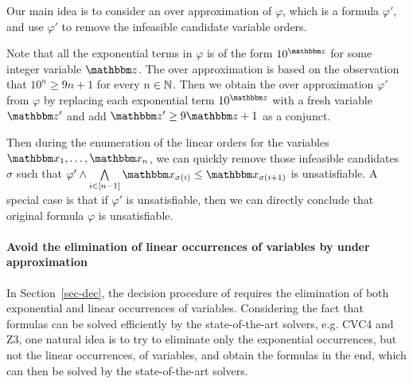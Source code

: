 Our main idea is to consider an over approximation of $\varphi$, which is a {\pa} formula $\varphi'$, and use $\varphi'$ to remove the infeasible candidate variable orders.

Note that all the exponential terms in $\varphi$ is of the form $10^{\ivarz}$ for some integer variable $\ivarz$. 
%
The over approximation is based on the observation that $10^n \ge 9 n + 1$ for every $n \in \mathbb{N}$. Then we obtain the over approximation $\varphi'$ from $\varphi$ by replacing each exponential term $10^{\ivarz}$ with a fresh variable $\ivarz'$ and add $\ivarz' \ge 9 \ivarz +1$ as a conjunct.

Then during the enumeration of the linear orders for the variables $\ivarx_1, \ldots, \ivarx_n$, we can quickly remove those infeasible candidates $\sigma$ such that $\varphi' \wedge \bigwedge \limits_{i \in [n-1]}\ivarx_{\sigma(i)} \le \ivarx_{\sigma(i+1)}$ is unsatisfiable. A special case is that if $\varphi'$ is unsatisfiable, then we can directly conclude that original formula $\varphi$ is unsatisfiable.




\paragraph{Avoid the elimination of linear occurrences of variables by under approximation}

In Section~\ref{sec-dec}, the decision procedure of {\paexp} requires the elimination of both exponential and linear occurrences of variables. Considering the fact that {\pa} formulas can be solved efficiently by the state-of-the-art solvers, e.g. CVC4 and Z3, one natural idea is to try to eliminate only the exponential occurrences, but not the linear occurrences, of variables, and obtain the {\pa} formulas in the end, which can then be solved by the state-of-the-art solvers.

